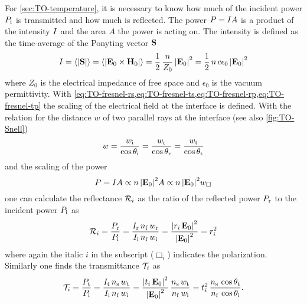 For \cref{sec:TO-temperature}, it is necessary to know how much of the incident 
power $P_{\mathrm{i}}$ is transmitted and how much is reflected. The power 
$P=I A$ is a product of the intensity $I$ and the area $A$ 
the power is acting on. The intensity is defined as the time-average of the 
Ponyting vector $\vb{S}$
\begin{equation}
  I = \left\langle \abs{\vb{S}} \right\rangle = 
  \left\langle \abs{\vb{E}_{0}\times\vb{H}_{0}} \right\rangle = 
  \frac{1}{2}\,\frac{n}{Z_{0}}\,\abs{\vb{E}_{0}}^{2} = 
  \frac{1}{2}\,n\,c\epsilon_{0}\,\abs{\vb{E}_{0}}^{2}
\end{equation}
where $Z_{0}$ is the electrical impedance of free space and $\epsilon_{0}$ is 
the vacuum permittivity. With 
\cref{eq:TO-fresnel-rs,eq:TO-fresnel-ts,eq:TO-fresnel-rp,eq:TO-fresnel-tp} the 
scaling of the electrical field at the interface is defined. With the relation 
for the distance $w$ of two parallel rays at the interface (see also 
\cref{fig:TO-Snell})
\begin{equation}
  w = \frac{w_{\mathrm{i}}}{\cos\theta_{\mathrm{i}}} = \frac{w_{\mathrm{r}}}{\cos\theta_{\mathrm{r}}} = 
  \frac{w_{\mathrm{t}}}{\cos\theta_{\mathrm{t}}}
  \label{eq:TO-area}
\end{equation}
and the scaling of the power
\begin{equation}
  P = I A \propto n\,\abs{\vb{E}_{0}}^{2}A \propto
  n\,\abs{\vb{E}_{0}}^{2}w_{\Box}
\end{equation}
one can calculate the reflectance $\mathcal{R}_{i}$ as the ratio of the reflected 
power $P_{\mathrm{r}}$ to the incident power $P_{\mathrm{i}}$ as
\begin{equation}
  \mathcal{R}_{i} = \frac{P_{\mathrm{r}}}{P_{\mathrm{i}}} = 
  \frac{I_{\mathrm{r}}\,n_{\mathrm{f}}\,w_{\mathrm{r}}}{I_{\mathrm{i}}\,n_{\mathrm{f}}\,w_{\mathrm{i}}} 
  =\frac{\abs{r_{i}\,\vb{E}_{0}}^{2}}{\abs{\vb{E}_{0}}^{2}} = 
  r_{i}^{2}
  \label{eq:TO-fresnelR}
\end{equation}
where again the italic $i$ in the subscript ($\Box_{i}$) indicates the 
polarization. Similarly one finds the transmittance $\mathcal{T}_{i}$ as
\begin{equation}
  \mathcal{T}_{i} = \frac{P_{\mathrm{t}}}{P_{\mathrm{i}}} = 
  \frac{I_{\mathrm{t}}\,n_{\mathrm{s}}\,w_{\mathrm{t}}}{I_{\mathrm{i}}\,n_{\mathrm{f}}\,w_{\mathrm{i}}} 
  =\frac{\abs{t_{i}\,\vb{E}_{0}}^{2}}{\abs{\vb{E}_{0}}^{2}}\,\frac{n_{\mathrm{s}}\,w_{\mathrm{t}}}{n_{\mathrm{f}}\,w_{\mathrm{i}}} 
  = t_{i}^{2}\,\frac{n_{\mathrm{s}}\,\cos\theta_{\mathrm{t}}}{n_{\mathrm{f}}\,\cos\theta_{\mathrm{i}}}.
  \label{eq:TO-fresnelT}
\end{equation}
